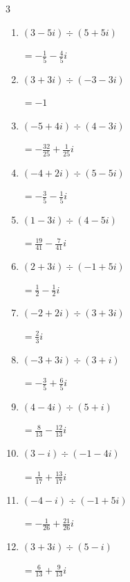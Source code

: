 \begin{multicols}{3}
\begin{enumerate}
  \item $\displaystyle (3-5i)\div(5+5i)$

        $\displaystyle =-\frac{1}{5}-\frac{4}{5}i$

  \item $\displaystyle (3+3i)\div(-3-3i)$

        $\displaystyle =-1$

  \item $\displaystyle (-5+4i)\div(4-3i)$

        $\displaystyle =-\frac{32}{25}+\frac{1}{25}i$

  \item $\displaystyle (-4+2i)\div(5-5i)$

        $\displaystyle =-\frac{3}{5}-\frac{1}{5}i$

  \item $\displaystyle (1-3i)\div(4-5i)$

        $\displaystyle =\frac{19}{41}-\frac{7}{41}i$

  \item $\displaystyle (2+3i)\div(-1+5i)$

        $\displaystyle =\frac{1}{2}-\frac{1}{2}i$

  \item $\displaystyle (-2+2i)\div(3+3i)$

        $\displaystyle =\frac{2}{3}i$

  \item $\displaystyle (-3+3i)\div(3+i)$

        $\displaystyle =-\frac{3}{5}+\frac{6}{5}i$

  \item $\displaystyle (4-4i)\div(5+i)$

        $\displaystyle =\frac{8}{13}-\frac{12}{13}i$

\columnbreak %

  \item $\displaystyle (3-i)\div(-1-4i)$

        $\displaystyle =\frac{1}{17}+\frac{13}{17}i$

  \item $\displaystyle (-4-i)\div(-1+5i)$

        $\displaystyle =-\frac{1}{26}+\frac{21}{26}i$

  \item $\displaystyle (3+3i)\div(5-i)$

        $\displaystyle =\frac{6}{13}+\frac{9}{13}i$


\end{enumerate}
\end{multicols}
